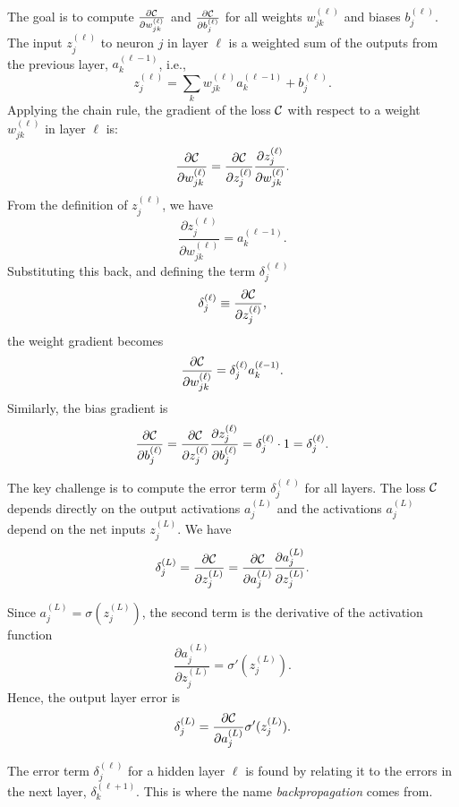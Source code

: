 The goal is to compute $\frac{\partial {\mathcal C}}{\partial w_{jk}^{(\ell)}}$ and $\frac{\partial {\mathcal C}}{\partial b_j^{(\ell)}}$ for all weights $w_{jk}^{(\ell)}$ and biases $b_j^{(\ell)}$.
The input  $z_j^{(\ell)}$ to neuron $j$ in layer $\ell$ is a weighted sum of the outputs from the previous layer, $a_k^{(\ell-1)}$, i.e., 
    $$z_j^{(\ell)} = \sum_{k} w_{jk}^{(\ell)} a_k^{(\ell-1)} + b_j^{(\ell)}.$$
Applying the chain rule, the gradient of the loss ${\mathcal C}$ with respect to a weight $w_{jk}^{(\ell)}$ in layer $\ell$ is:
$$\frac{\partial {\mathcal C}}{\partial w_{jk}^{(\ell)}} = \frac{\partial {\mathcal C}}{\partial z_j^{(\ell)}} \frac{\partial z_j^{(\ell)}}{\partial w_{jk}^{(\ell)}}.$$
From the definition of $z_j^{(\ell)}$, we have
$$\frac{\partial z_j^{(\ell)}}{\partial w_{jk}^{(\ell)}} = a_k^{(\ell-1)}.$$
Substituting this back, and defining the term $\delta_j^{(\ell)}$
$$\delta_j^{(\ell)} \equiv \frac{\partial {\mathcal C}}{\partial z_j^{(\ell)}},$$%
the weight gradient becomes
\begin{equation}
    \label{BP-1}
    \frac{\partial {\mathcal C}}{\partial w_{jk}^{(\ell)}} = \delta_j^{(\ell)} a_k^{(\ell-1)}.
\end{equation}
Similarly, the bias gradient is
\begin{equation}
    \label{BP-2}
\frac{\partial {\mathcal C}}{\partial b_j^{(\ell)}} = \frac{\partial {\mathcal C}}{\partial z_j^{(\ell)}} \frac{\partial z_j^{(\ell)}}{\partial b_j^{(\ell)}} = \delta_j^{(\ell)} \cdot 1 = \delta_j^{(\ell)}.
\end{equation}

The key challenge is to compute the error term $\delta_j^{(\ell)}$ for all layers.
The loss ${\mathcal C}$ depends directly on the output activations $a_j^{(L)}$ and the activations $a_j^{(L)}$ depend on the net inputs $z_j^{(L)}$. We have
$$\delta_j^{(L)} = \frac{\partial {\mathcal C}}{\partial z_j^{(L)}} = \frac{\partial {\mathcal C}}{\partial a_j^{(L)}} \frac{\partial a_j^{(L)}}{\partial z_j^{(L)}}.$$

Since $a_j^{(L)} = \sigma(z_j^{(L)})$, the second term is the derivative of the activation function
$$\frac{\partial a_j^{(L)}}{\partial z_j^{(L)}} = \sigma'(z_j^{(L)}).$$
Hence, the output layer error is
\begin{equation}
    \label{BP-3}
\delta_j^{(L)} = \frac{\partial {\mathcal C}}{\partial a_j^{(L)}} \sigma'(z_j^{(L)}).
\end{equation}



The error term $\delta_j^{(\ell)}$ for a hidden layer $\ell$ is found by relating it to the errors in the next layer, $\delta_k^{(\ell+1)}$. This is where the name {\em backpropagation} comes from.


